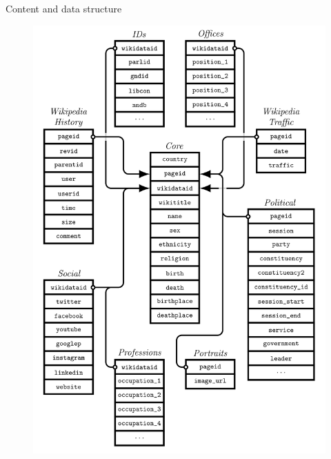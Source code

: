\begin{frame}{Content and data structure}
\begin{figure}[t]
\begin{center}
\vspace{-.3cm}
	\includegraphics[height=.85\textheight]{data-structure.png}
\end{center}
\end{figure}
\end{frame}

